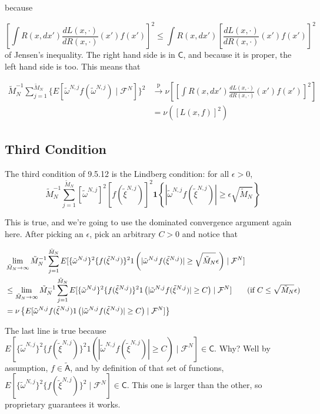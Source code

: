 \documentclass{article}
\begin{document}
because

$$
\left[ \int R(x,dx') \frac{dL(x,\cdot)}{dR(x,\cdot)}(x') f(x') \right]^2 \le \int R(x,dx')\left[ \frac{dL(x,\cdot)}{dR(x,\cdot)}(x') f(x') \right]^2
$$
of Jensen's inequality. The right hand side is in $\mathsf{C}$, and because it is proper, the left hand side is too. This means that 

\begin{align*}
\tilde{M}_N^{-1}\sum_{j=1}^{\tilde{M}_N} \{E\left[  \tilde{\omega}^{N,j} f(\tilde{\omega}^{N,j})  \mid \mathcal{F}^N \right]\}^2 
&\overset{\text{p}}{\to} \nu\left[ \left[ \int R(x,dx') \frac{dL(x,\cdot)}{dR(x,\cdot)}(x') f(x') \right]^2  \right] \\
&= \nu\left(\left[L(x,f) \right]^2\right)
\end{align*}


\subsection{Third Condition}


The third condition of 9.5.12 is the Lindberg condition: for all $\epsilon > 0$,
$$
\tilde{M}_N^{-1} \sum_{j=1}^{\tilde{M}_N} [\tilde{\omega}^{N,j}]^2 [f(\tilde{\xi}^{N,j})]^2 \mathbf{1}\left\{ |\tilde{\omega}^{N,j} f(\tilde{\xi}^{N,j}) | \ge \epsilon\sqrt{\tilde{M}_N}   \right\}
$$



This is true, and we're going to use the dominated convergence argument again here. After picking an $\epsilon$, pick an arbitrary $C > 0$ and notice that

\begin{align*}
& \lim_{\tilde{M}_N \to \infty} \tilde{M}_N^{-1} \sum_{j=1}^{\tilde{M}_N} E[ \{\tilde{\omega}^{N,j}\}^2 \{ f(\tilde{\xi}^{N,j})\}^2 1\left( |\tilde{\omega}^{N,j} f(\tilde{\xi}^{N,j})| \ge \sqrt{\tilde{M}_N} \epsilon \right) \mid \mathcal{F}^N]  \\
&\le \lim_{\tilde{M}_N \to \infty} \tilde{M}_N^{-1} \sum_{j=1}^{\tilde{M}_N} E[  \{\tilde{\omega}^{N,j}\}^2 \{ f(\tilde{\xi}^{N,j})\}^2 1\left( |\tilde{\omega}^{N,j} f(\tilde{\xi}^{N,j})| \ge C \right) \mid \mathcal{F}^N]  \tag{if $C \le \sqrt{\tilde{M}_N} \epsilon$} \\
&= \nu\left\{ E[ \tilde{\omega}^{N,j} f(\tilde{\xi}^{N,j}) 1\left( |\tilde{\omega}^{N,j} f(\tilde{\xi}^{N,j})| \ge C \right) \mid \mathcal{F}^N] \right\}
\end{align*}

The last line is true because $E[  \{\tilde{\omega}^{N,j}\}^2 \{ f(\tilde{\xi}^{N,j})\}^2 1\left( |\tilde{\omega}^{N,j} f(\tilde{\xi}^{N,j})| \ge C \right) \mid \mathcal{F}^N]   \in \mathsf{C}$. Why? Well by assumption, $f \in \tilde{\mathsf{A}}$, and by definition of that set of functions, $E[  \{\tilde{\omega}^{N,j}\}^2 \{ f(\tilde{\xi}^{N,j})\}^2  \mid \mathcal{F}^N]   \in \mathsf{C}$. This one is larger than the other, so proprietary guarantees it works. 
\end{document}

